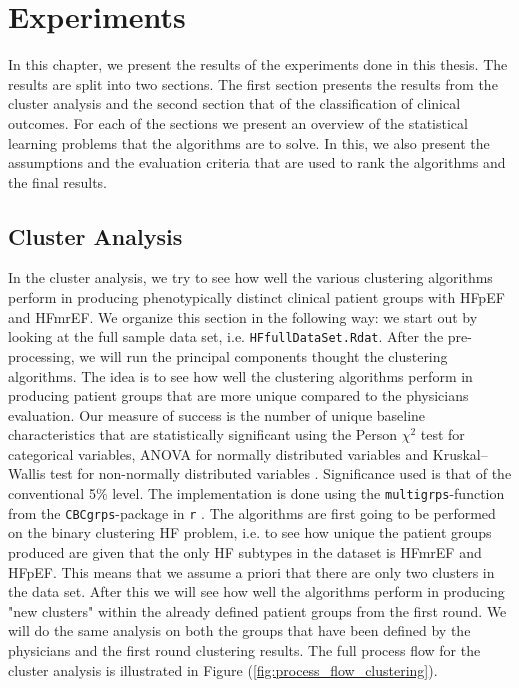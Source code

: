 \documentclass[../thesis.tex]{subfiles}
\begin{document}
\chapter{Experiments}
\label{chap:exp}

\noindent In this chapter, we present the results of the experiments done in this thesis. The results are split into two sections. The first section presents the results from the cluster analysis and the second section that of the classification of clinical outcomes. For each of the sections we present an overview of the statistical learning problems that the algorithms are to solve. In this, we also present the assumptions and the evaluation criteria that are used to rank the algorithms and the final results. 

\section{Cluster Analysis}

\noindent In the cluster analysis, we try to see how well the various clustering algorithms perform in producing phenotypically distinct clinical patient groups with HFpEF and HFmrEF. We organize this section in the following way: we start out by looking at the full sample data set, i.e. \texttt{HFfullDataSet.Rdat}. After the pre-processing, we will run the principal components thought the clustering algorithms. The idea is to see how well the clustering algorithms perform in producing patient groups that are more unique compared to the physicians evaluation. Our measure of success is the number of unique baseline characteristics that are statistically significant using the Person $\chi^2$ test for categorical variables, ANOVA for normally distributed variables and Kruskal–Wallis test for non-normally distributed variables \citep{kruskal1952use}. Significance used is that of the conventional 5\% level. The implementation is done using the \texttt{multigrps}-function from the \texttt{CBCgrps}-package in \texttt{r} \citep{CBCgrps}. The algorithms are first going to be performed on the binary clustering HF problem, i.e. to see how unique the patient groups produced are given that the only HF subtypes in the dataset is HFmrEF and HFpEF. This means that we assume a priori that there are only two clusters in the data set. After this we will see how well the algorithms perform in producing "new clusters" within the already defined patient groups from the first round. We will do the same analysis on both the groups that have been defined by the physicians and the first round clustering results. The full process flow for the cluster analysis is illustrated in Figure (\ref{fig:process_flow_clustering}).
\end{document}
